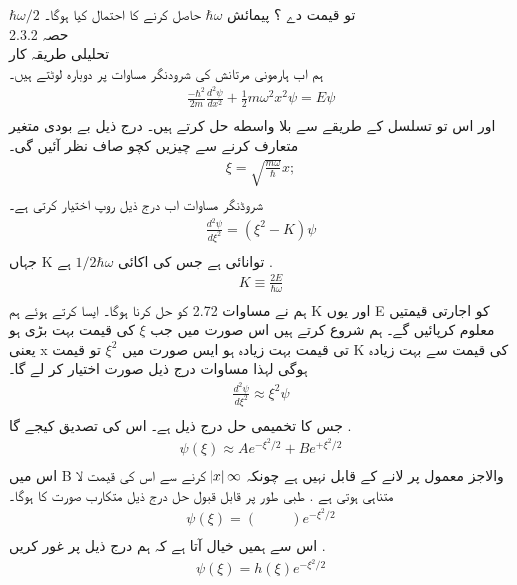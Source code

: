\documentclass{book}
\begin{document}
\(\hbar \omega/2\)
تو قیمت دے ؟ پیمائش
\(\hbar\omega\)
حاصل کرنے کا احتمال کیا ہوگا۔\\
حصہ
2.3.2\\
تحلیلی طریقہ کار\\
ہم اب ہارمونی مرتانش کی شرودنگر مساوات پر دوبارہ لوٹتے ہیں۔
\begin{align*}
\frac{-\hbar^{2}}{2m}\frac{d^{2}\psi}{dx^{2}}+\frac{1}{2}m\omega^{2}x^{2}\psi=E\psi\\
\end{align*}
اور اس تو تسلسل کے طریقے سے بلا واسطه حل کرتے ہیں۔ درج ذیل بے بودی متغیر متعارف کرنے سے چیزیں کچو صاف نظر آئیں گی۔
\begin{align*}
\xi=\sqrt{\frac{m\omega}{\hbar}}x;\\
\end{align*}
شروڈنگر مساوات اب درج ذیل روپ اختیار کرتی ہے۔
\begin{align*}
\frac{d^{2}\psi}{d\xi^{2}}=(\xi^{2}-K)\psi\\
\end{align*}
جہاں
K
توانائی ہے جس کی اکائی
\(1/2\hbar\omega\)
ہے .
\begin{align*}
K\equiv \frac{2E}{\hbar\omega}\\
\end{align*}
ہم نے مساوات
2.72
کو حل کرنا ہوگا۔ ایسا کرتے ہوئے ہم
K
اور یوں
E
کو اجارتی قیمتیں معلوم کرپائیں گے۔ ہم شروع کرتے ہیں اس صورت میں جب
\(\xi\)
کی قیمت بہت بڑی ہو یعنی
x
تی قیمت بہت زیادہ ہو ایس صورت میں
\(\xi^{2}\)
تو قیمت
K
کی قیمت سے بہت زیادہ ہوگی لہذا مساوات درج ذیل صورت اختیار کر لے گا۔
\begin{align*}
\frac{d^{2}\psi}{d\xi^{2}}\approx \xi^{2}\psi\\
\end{align*}
جس کا تخمیمی حل درج ذیل ہے۔ اس کی تصدیق کیجے گا .
\begin{align*}
\psi(\xi)\approx Ae^{-\xi^{2}/2}+Be^{+\xi^{2}/2}\\
\end{align*}
اس میں
B
والاجز معمول پر لانے کے قابل نہیں ہے چونکہ
\(\abs{x}\infty\)
کرنے سے اس کی قیمت لا متناہی ہوتی ہے . طبی طور پر قابل قبول حل درج ذیل متکارب صورت کا ہوگا۔
\begin{align*}
\psi(\xi)=(\hspace{1cm})e^{-\xi^{2}/2}\\
\end{align*}
اس سے ہمیں خیال آتا ہے کہ ہم درج ذیل پر غور کریں .
\begin{align*}
\psi(\xi)=h(\xi)e^{-\xi^{2}/2}\\
\end{align*}
\end{document}
